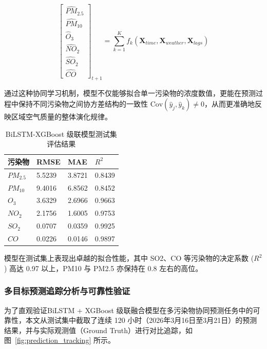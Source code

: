 \documentclass[a4paper, 12pt]{ctexart} %
\begin{document}
\begin{equation}
\begin{bmatrix} 
\hat{PM}_{2.5} \\ \hat{PM}_{10} \\ \hat{O}_3 \\ \hat{NO}_2 \\ \hat{SO}_2 \\ \hat{CO} 
\end{bmatrix}_{t+1} = \sum_{k=1}^{K} f_k \left( \mathbf{X}_{time}, \mathbf{X}_{weather}, \mathbf{X}_{lags} \right)
\end{equation}

通过这种协同学习机制，模型不仅能够拟合单一污染物的浓度数值，更能在预测过程中保持不同污染物之间协方差结构的一致性 $\text{Cov}(\hat{y}_j, \hat{y}_k) \neq 0$，从而更准确地反映区域空气质量的整体演化规律。

\begin{table}[htbp]
    \centering
    \caption{BiLSTM-XGBoost 级联模型测试集评估结果}
    \label{tab:evaluation_results}
    \begin{tabularx}{\textwidth}{@{} YYYY @{}} 
        \toprule
        \textbf{污染物} & \textbf{RMSE} & \textbf{MAE} & \textbf{$R^2$} \\
        \midrule
        $PM_{2.5}$ & 5.5239 & 3.8721 & 0.8439 \\
        $PM_{10}$  & 9.4016 & 6.8562 & 0.8452 \\
        $O_3$      & 3.6329 & 2.6966 & 0.9663 \\
        $NO_2$     & 2.1756 & 1.6005 & 0.9753 \\
        $SO_2$     & 0.0707 & 0.0359 & 0.9925 \\
        $CO$       & 0.0226 & 0.0146 & 0.9897 \\
        \bottomrule
    \end{tabularx}
\end{table}

模型在测试集上表现出卓越的拟合性能，其中 SO2、CO 等污染物的决定系数 ($R^2$) 高达 0.97 以上，PM10 与 PM2.5 亦保持在 0.8 左右的高位。

\subsubsection{多目标预测追踪分析与可靠性验证}

为了直观验证BiLSTM + XGBoost 级联融合模型在多污染物协同预测任务中的可靠性，本文从测试集中截取了连续 120 小时（2026年3月16日至3月21日）的预测结果，并与实际观测值（Ground Truth）进行对比追踪，如图~\ref{fig:prediction_tracking} 所示。
\end{document}
